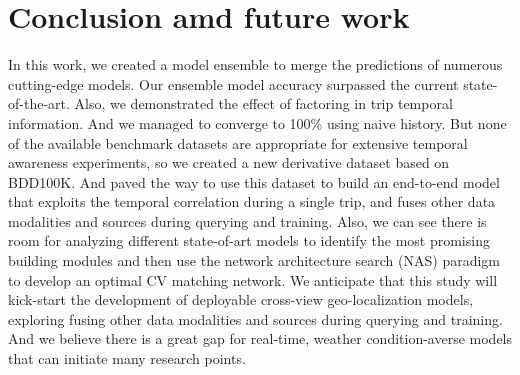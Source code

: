 \documentclass[10pt,letterpaper]{article}
\begin{document}
\section*{Conclusion amd future work}
In this work, we created a model ensemble to merge the predictions of numerous cutting-edge models. Our ensemble model accuracy surpassed the current state-of-the-art. Also, we demonstrated the effect of factoring in trip temporal information. And we managed to converge to 100\% using naive history. But none of the available benchmark datasets are appropriate for extensive temporal awareness experiments, so we created a new derivative dataset based on BDD100K. And paved the way to use this dataset to build an end-to-end model that exploits the temporal correlation during a single trip, and fuses other data modalities and sources during querying and training. Also, we can see there is room for analyzing different state-of-art models to identify the most promising building modules and then use the network architecture search (NAS) paradigm to develop an optimal CV matching network. We anticipate that this study will kick-start the development of deployable cross-view geo-localization models, exploring fusing other data modalities and sources during querying and training. And we believe there is a great gap for real-time, weather condition-averse models that can initiate many research points.

\nolinenumbers
\FloatBarrier
\end{document}
